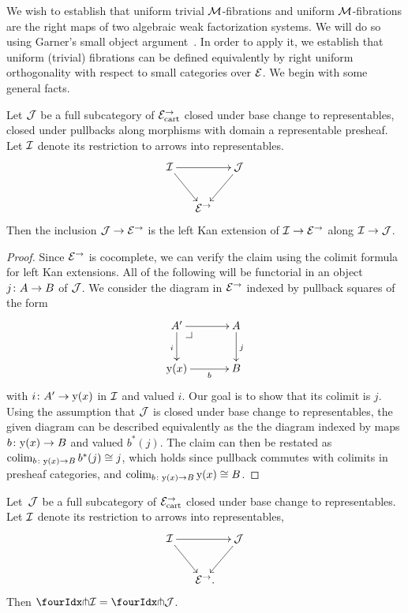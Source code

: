 \documentclass[reqno,10pt,a4paper,oneside,draft]{amsart}
\begin{document}
We wish to establish that uniform trivial $\cal{M}$-fibrations and uniform $\cal{M}$-fibrations are the right maps of two algebraic weak factorization systems.
We will do so using Garner's small object argument~\cite{garner:small-object-argument}.
In order to apply it, we establish that uniform (trivial) fibrations can be defined equivalently by right uniform 
orthogonality 
with respect to small categories over $\catE$. We begin with some general facts.

\begin{lemma} \label{left-kan-extension-of-representables}
Let $\cal{J}$ be a full subcategory of $\catE_{\cart}^\to$ closed under base change to representables, \ie closed under pullbacks along morphisms with domain a representable presheaf.
Let $\cal{I}$ denote its restriction to arrows into representables.
\[
\xymatrix@C-1em{
  \cal{I}
  \ar[rr]
  \ar[dr]
&&
  \cal{J}
  \ar[dl]
\\&
  \catE^\to
}
\]
Then the inclusion $\cal{J} \to \catE^\to$ is the left Kan extension of $\cal{I} \to \catE^\to$ along $\cal{I} \to \cal{J}$.
\end{lemma}

\begin{proof}
Since $\catE^\to$ is cocomplete, we can verify the claim using the colimit formula for left Kan extensions.
All of the following will be functorial in an object $j \co A \to B$ of $\cal{J}$.
We consider the diagram in $\catE^\to$ indexed by pullback squares of the form
\[
\xymatrix@C=1.2cm{
  A'
  \ar[r]
  \ar[d]_{i}
  \pullback{dr}
&
  A
  \ar[d]^{j}
\\
  \yon(x)
  \ar[r]_-{b}
&
  B
}
\]
with $i \co A' \to \yon(x)$ in $\cal{I}$ and valued $i$.
Our goal is to show that its colimit is $j$.
Using the assumption that $\cal{J}$ is closed under base change to representables, the given diagram can be described equivalently as the the diagram indexed by maps $b \co \yon(x) \to B$ and valued $b^*(j)$.
The claim can then be restated as $\colim_{b \co \yon(x) \to B} b^*(j) \iso j$, which holds since pullback commutes with colimits in presheaf categories, and $\colim_{b \co \yon(x) \to B} \yon(x) \iso B$.
\end{proof}

\begin{proposition} \label{awfs-on-arrows-into-representables}
Let~$\cal{J}$ be a full subcategory of $\catE_{\cart}^\to$ closed under base change to representables.
Let $\cal{I}$ denote its restriction to arrows into representables,
\[
\xymatrix@C-1em{
  \cal{I}
  \ar[rr]
  \ar[dr]
&&
  \cal{J}
  \ar[dl]
\\&
  \catE^\to
\rlap{.}}
\]
Then $\liftr{\cal{I}} = \liftr{\cal{J}}$.
\end{proposition}
\end{document}
